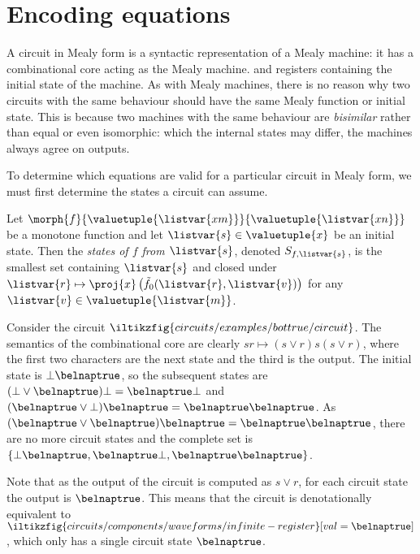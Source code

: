 \section{Encoding equations}

A circuit in Mealy form is a syntactic representation of a Mealy machine: it
has a combinational core acting as the Mealy machine. and registers containing
the initial state of the machine.
As with Mealy machines, there is no reason why two circuits with the same
behaviour should have the same Mealy function or initial state.
This is because two machines with the same behaviour are \emph{bisimilar}
rather than equal or even isomorphic: which the internal states may differ, the
machines always agree on outputs.

To determine which equations are valid for a particular circuit in Mealy form,
we must first determine the states a circuit can assume.

\begin{definition}[States]
    Let \(\morph{f}{\valuetuple{\listvar{xm}}}{\valuetuple{\listvar{xn}}}\) be a
    monotone function and let \(\listvar{s} \in  \valuetuple{x}\) be an
    initial state.
    Then the \emph{states of \(f\) from \(\listvar{s}\)}, denoted
    \(S_{f,\listvar{s}}\), is the smallest set containing \(\listvar{s}\) and
    closed under \(
    \listvar{r}
    \mapsto
    \proj{x}\left(\tilde{f}_0(\listvar{r},\listvar{v})\right)
    \) for any \(\listvar{v} \in \valuetuple{\listvar{m}}\).
\end{definition}

\begin{example}\label{ex:circuit-states}
    Consider the circuit \(
    \iltikzfig{circuits/examples/bottrue/circuit}
    \).
    The semantics of the combinational core are clearly
    \(sr \mapsto (s \lor r)s(s \lor r)\), where the first two characters are the
    next state and the third is the output.
    The initial state is \(\bot\belnaptrue\), so the subsequent states are
    \((\bot \lor \belnaptrue)\bot = \belnaptrue\bot\) and
    \((\belnaptrue \lor \bot)\belnaptrue = \belnaptrue\belnaptrue\).
    As \((\belnaptrue \lor \belnaptrue)\belnaptrue = \belnaptrue\belnaptrue\),
    there are no more circuit states and the complete set is
    \(\{\bot\belnaptrue,\belnaptrue\bot,\belnaptrue\belnaptrue\}\).

    Note that as the output of the circuit is computed as \(s \lor r\), for each
    circuit state the output is \(\belnaptrue\).
    This means that the circuit is denotationally equivalent to \(
    \iltikzfig{circuits/components/waveforms/infinite-register}[val=\belnaptrue]
    \), which only has a single circuit state \(\belnaptrue\).
\end{example}

